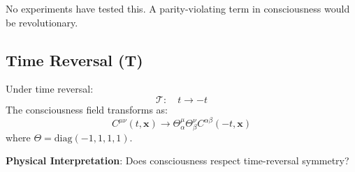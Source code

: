 No experiments have tested this. A parity-violating term in consciousness would be revolutionary.

\subsection{Time Reversal (T)}

\begin{definition}\label{def:t-symmetry-consciousness}
Under time reversal:
\begin{equation}
\mathcal{T}: \quad t \to -t
\end{equation}
The consciousness field transforms as:
\begin{equation}
C^{\mu\nu}(t, \mathbf{x}) \to \Theta^\mu_\alpha \Theta^\nu_\beta C^{\alpha\beta}(-t, \mathbf{x})
\end{equation}
where $\Theta = \text{diag}(-1, 1, 1, 1)$.
\end{definition}

\textbf{Physical Interpretation}: Does consciousness respect time-reversal symmetry?

